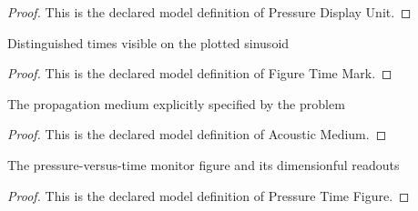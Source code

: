 \begin{proof}
  This is the declared model definition of Pressure Display Unit.
\end{proof}
\begin{definition}
  \label{def:physics:phyx-mini-0309:phyxminiproblems-problemphyxmini0309-figuretimemark}
  Distinguished times visible on the plotted sinusoid
\end{definition}
\begin{proof}
  This is the declared model definition of Figure Time Mark.
\end{proof}
\begin{definition}
  \label{def:physics:phyx-mini-0309:phyxminiproblems-problemphyxmini0309-acousticmedium}
  The propagation medium explicitly specified by the problem
\end{definition}
\begin{proof}
  This is the declared model definition of Acoustic Medium.
\end{proof}
\begin{definition}
  \label{def:physics:phyx-mini-0309:phyxminiproblems-problemphyxmini0309-pressuretimefigure}
  The pressure-versus-time monitor figure and its dimensionful readouts
\end{definition}
\begin{proof}
  This is the declared model definition of Pressure Time Figure.
\end{proof}
